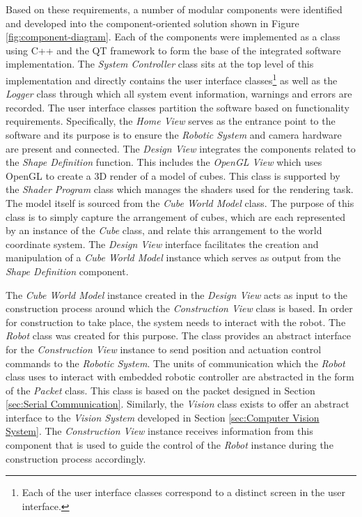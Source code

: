 Based on these requirements, a number of modular components were identified and developed into the component-oriented solution shown in Figure \ref{fig:component-diagram}. Each of the components were implemented as a class using C++ and the QT framework to form the base of the integrated software implementation. The \textit{System Controller} class sits at the top level of this implementation and directly contains the user interface classes\footnote{Each of the user interface classes correspond to a distinct screen in the user interface.} as well as the \textit{Logger} class through which all system event information, warnings and errors are recorded. The user interface classes partition the software based on functionality requirements. Specifically, the \textit{Home View} serves as the entrance point to the software and its purpose is to ensure the \textit{Robotic System} and camera hardware are present and connected. The \textit{Design View} integrates the components related to the \textit{Shape Definition} function. This includes the \textit{OpenGL View} which uses OpenGL to create a 3D render of a model of cubes. This class is supported by the \textit{Shader Program} class which manages the shaders used for the rendering task. The model itself is sourced from the \textit{Cube World Model} class. The purpose of this class is to simply capture the arrangement of cubes, which are each represented by an instance of the \textit{Cube} class, and relate this arrangement to the world coordinate system. The \textit{Design View} interface facilitates the creation and manipulation of a \textit{Cube World Model} instance which serves as output from the \textit{Shape Definition} component.

The \textit{Cube World Model} instance created in the \textit{Design View} acts as input to the construction process around which the \textit{Construction View} class is based. In order for construction to take place, the system needs to interact with the robot. The \textit{Robot} class was created for this purpose. The class provides an abstract interface for the \textit{Construction View} instance to send position and actuation control commands to the \textit{Robotic System}. The units of communication which the \textit{Robot} class uses to interact with embedded robotic controller are abstracted in the form of the \textit{Packet} class. This class is based on the packet designed in Section \ref{sec:Serial Communication}. Similarly, the \textit{Vision} class exists to offer an abstract interface to the \textit{Vision System} developed in Section \ref{sec:Computer Vision System}. The \textit{Construction View} instance receives information from this component that is used to guide the control of the \textit{Robot} instance during the construction process accordingly.

